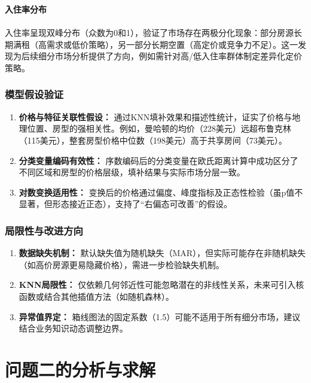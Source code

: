 \documentclass[12pt]{article}
\begin{document}
\begin{CJK}{UTF8}{gbsn}
	\textbf{入住率分布}\\\\
	\indent 入住率呈现双峰分布（众数为0和1），验证了市场存在两极分化现象：部分房源长期满租（高需求或低价策略），另一部分长期空置（高定价或竞争力不足）。这一发现为后续细分市场分析提供了方向，例如需针对高/低入住率群体制定差异化定价策略。
	
	\subsubsection{模型假设验证}
	\begin{enumerate}
		\item \textbf{价格与特征关联性假设：} 通过KNN填补效果和描述性统计，证实了价格与地理位置、房型的强相关性。例如，曼哈顿的均价（228美元）远超布鲁克林（115美元），整套房型价格中位数（198美元）高于共享房间（73美元）。
		\item \textbf{分类变量编码有效性：} 序数编码后的分类变量在欧氏距离计算中成功区分了不同区域和房型的价格层级，填补结果与实际市场分层一致。
		\item \textbf{对数变换适用性：} 变换后的价格通过偏度、峰度指标及正态性检验（虽p值不显著，但形态接近正态），支持了“右偏态可改善”的假设。
	\end{enumerate}
	
	\subsubsection{局限性与改进方向}
	\begin{enumerate}
		\item \textbf{数据缺失机制：} 默认缺失值为随机缺失（MAR），但实际可能存在非随机缺失（如高价房源更易隐藏价格），需进一步检验缺失机制。
		\item \textbf{KNN局限性：} 仅依赖几何邻近性可能忽略潜在的非线性关系，未来可引入核函数或结合其他插值方法（如随机森林）。
		\item \textbf{异常值界定：} 箱线图法的固定系数（1.5）可能不适用于所有细分市场，建议结合业务知识动态调整边界。
	\end{enumerate}
	
	\section{问题二的分析与求解}
	

\end{CJK}
\end{document}
